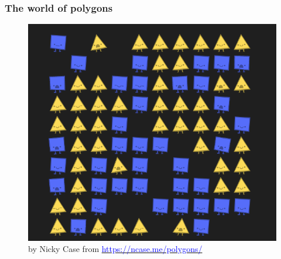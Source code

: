 \documentclass{beamer}
\begin{document}
\begin{frame}
   \frametitle{The world of polygons}
   \begin{figure}
      \includegraphics[width = .7\textwidth]{polygons.png}
      \caption{by Nicky Case from \href{https://ncase.me/polygons/}{\textcolor{blue}{https://ncase.me/polygons/}}}
   \end{figure}

\end{frame}
\end{document}
